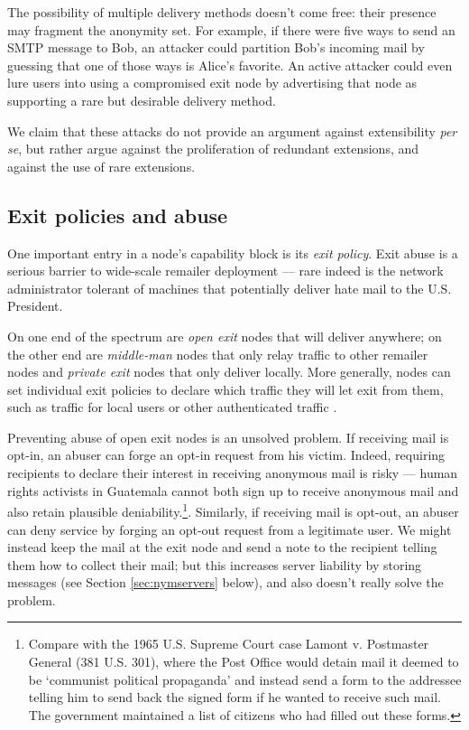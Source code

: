 \documentclass{llncs}
\begin{document}
%

The possibility of multiple delivery methods doesn't come free: their
presence may fragment the anonymity set.  For example, if there were five
ways to send an SMTP message to Bob, an attacker could partition Bob's
incoming mail by guessing that one of those ways is Alice's favorite.
An active attacker could even lure users into using a compromised
exit node by advertising that node as supporting a
rare but desirable delivery method.

We claim that these attacks do not provide an argument against
extensibility \emph{per se}, but rather argue against the proliferation
of redundant extensions, and against the use of rare extensions.  

\subsection{Exit policies and abuse}
\label{subsec:exitpolicies}

One important entry in a node's capability block is its \emph{exit
policy}. Exit abuse is a serious barrier to wide-scale remailer deployment
--- rare indeed is the network administrator tolerant of machines that
potentially deliver hate mail to the U.S. President.

On one end of the spectrum are \emph{open exit} nodes that will
deliver anywhere; on the other end are \emph{middle-man} nodes that
only relay traffic to other remailer nodes and \emph{private exit}
nodes that only deliver locally. More generally, nodes can set
individual exit policies to declare which traffic they will let exit
from them, such as traffic for local users or other authenticated
traffic \cite{onion-discex00}.

Preventing abuse of open exit nodes is an unsolved problem. If
receiving mail is opt-in, an abuser can forge an opt-in request from
his victim. Indeed, requiring recipients to declare their interest
in receiving anonymous mail is risky --- human rights activists in
Guatemala cannot both sign up to receive anonymous mail and also retain
plausible deniability.\footnote{
  Compare with the 1965 U.S. Supreme Court case Lamont v. Postmaster
  General (381 U.S. 301), where the Post Office would detain mail it
  deemed to be `communist political propaganda' and instead send a form
  to the addressee telling him to send back the signed form if he wanted
  to receive such mail. The government maintained a list of citizens
  who had filled out these forms.
}. Similarly, if receiving mail is opt-out, an abuser can deny service
by forging an opt-out request from a legitimate user. We might instead
keep the mail at the exit node and send a note to the recipient
telling them how to collect their mail; but this increases
server liability by storing messages (see Section \ref{sec:nymservers}
below), and also doesn't really solve the problem.
\end{document}
